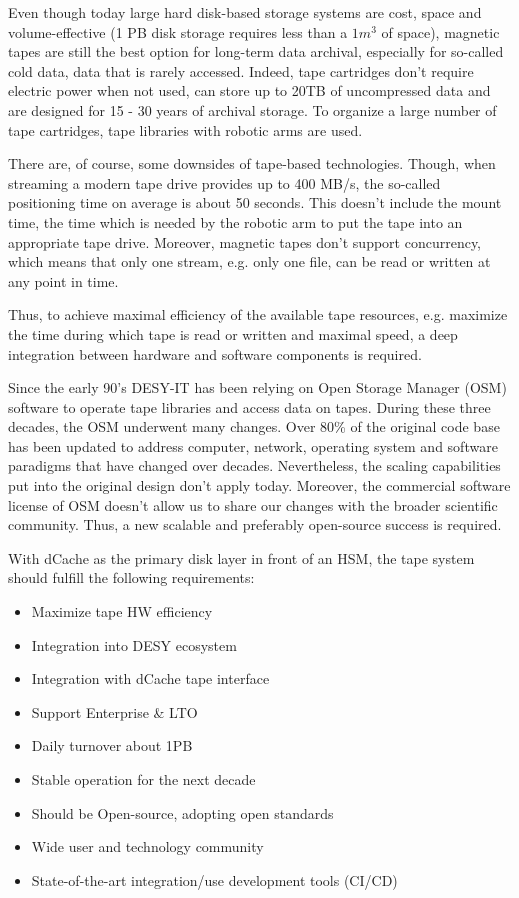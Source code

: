 \documentclass{webofc}
\begin{document}
Even though today large hard disk-based storage systems are cost, space and volume-effective (1 PB disk storage requires less than a ${1m^{3}}$ of space),
magnetic tapes are still the best option for long-term data archival, especially for so-called cold data, data that is rarely accessed.
Indeed, tape cartridges don't require electric power when not used, can store up to 20TB of uncompressed data and are designed for
15 - 30 years of archival storage. To organize a large number of tape cartridges, tape libraries with robotic arms are used.

There are, of course, some downsides of tape-based technologies. Though, when streaming a modern tape drive provides up to 400 MB/s,
the so-called positioning time on average is about 50 seconds. This doesn't include the mount time, the time which is needed by the
robotic arm to put the tape into an appropriate tape drive. Moreover, magnetic tapes don't support concurrency, which means that only
one stream, e.g. only one file, can be read or written at any point in time.

Thus, to achieve maximal efficiency of the available tape resources, e.g. maximize the time during which tape is read or written and
maximal speed, a deep integration between hardware and software components is required.

Since the early 90's DESY-IT has been relying on Open Storage Manager (OSM) software to operate tape libraries and access data on tapes\cite{osm_desy}.
During these three decades, the OSM underwent many changes. Over 80\% of the original code base has been updated to address computer, network,
operating system and software paradigms that have changed over decades. Nevertheless, the scaling capabilities put into the original design
don't apply today. Moreover, the commercial software license of OSM doesn't allow us to share our changes with the broader scientific community.
Thus, a new scalable and preferably open-source success is required.

With dCache as the primary disk layer in front of an HSM, the tape system should fulfill the following requirements:

\begin{itemize}
    \item Maximize tape HW efficiency
    \item Integration into DESY ecosystem
    \item Integration with dCache tape interface
    \item Support Enterprise \& LTO
    \item Daily turnover about 1PB
    \item Stable operation for the next decade
    \item Should be Open-source, adopting open standards
    \item Wide user and technology community
    \item State-of-the-art integration/use development tools (CI/CD)
\end{itemize}
\end{document}
